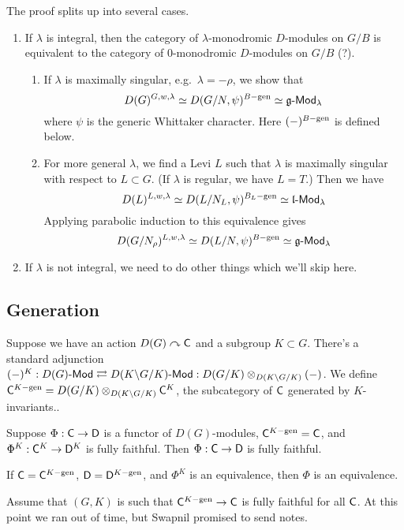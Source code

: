 \documentclass{article}
\begin{document}
The proof splits up into several cases.
\begin{enumerate}
	\item If $\lambda$ is integral, then the category of $\lambda$-monodromic $D$-modules on $G/B$ is equivalent to the category of $0$-monodromic $D$-modules on $G/B$ (?).
	\begin{enumerate}
		\item If $\lambda$ is maximally singular, e.g.\ $\lambda = -\rho$, we show that
			\[
				D(G)^{G,w,\lambda} \simeq D(G/N, \psi)^{B\mathrm{-gen}} \simeq \mathfrak{g}\text{-}\mathsf{Mod}_\lambda
			\]
			where $\psi$ is the generic Whittaker character.
			Here $(-)^{B\mathrm{-gen}}$ is defined below.
		\item For more general $\lambda$, we find a Levi $L$ such that $\lambda$ is maximally singular with respect to $L \subset G$.
			(If $\lambda$ is regular, we have $L = T$.)
			Then we have
			\[
				D(L)^{L,w,\lambda} \simeq D(L/N_L, \psi)^{B_L\mathrm{-gen}} \simeq \mathfrak{l}\text{-}\mathsf{Mod}_\lambda
			\]
			Applying parabolic induction to this equivalence gives
			\[
				D(G/N_\rho)^{L,w,\lambda} \simeq D(L/N, \psi)^{B\mathrm{-gen}} \simeq \mathfrak{g}\text{-}\mathsf{Mod}_\lambda
			\]
	\end{enumerate}
	\item If $\lambda$ is not integral, we need to do other things which we'll skip here.
\end{enumerate}

\subsection{Generation}

Suppose we have an action $D(G) \curvearrowright \mathsf{C}$ and a subgroup $K \subset G$.
There's a standard adjunction $(-)^K: D(G)\text{-}\mathsf{Mod} \rightleftarrows D(K \backslash G / K)\text{-}\mathsf{Mod} : D(G/K) \otimes_{D(K \backslash G / K)} (-)$.
We define $\mathsf{C}^{K\mathrm{-gen}} = D(G/K) \otimes_{D(K \backslash G / K)} \mathsf{C}^K$, the subcategory of $\mathsf{C}$ generated by $K$-invariants..

\begin{prop}
	Suppose $\Phi: \mathsf{C} \to \mathsf{D}$ is a functor of $D(G)$-modules, $\mathsf{C}^{K\mathrm{-gen}} = \mathsf{C}$, and $\Phi^K: \mathsf{C}^K \to \mathsf{D}^K$ is fully faithful.
	Then $\Phi: \mathsf{C} \to \mathsf{D}$ is fully faithful.
\end{prop}

\begin{prop}
	If $\mathsf{C} = \mathsf{C}^{K\mathrm{-gen}}$, $\mathsf{D} = \mathsf{D}^{K\mathrm{-gen}}$, and $\Phi^K$ is an equivalence, then $\Phi$ is an equivalence.
\end{prop}

Assume that $(G, K)$ is such that $\mathsf{C}^{K\mathrm{-gen}} \to \mathsf{C}$ is fully faithful for all $\mathsf{C}$.
At this point we ran out of time, but Swapnil promised to send notes.
\end{document}
